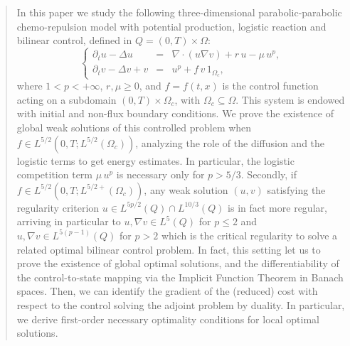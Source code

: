 \documentclass[11pt,reqno]{amsart}%
\numberwithin{equation}{section}
\begin{document}
\begin{abstract}
In this paper we study the following three-dimensional parabolic-parabolic chemo-repulsion model with potential production, logistic reaction and bilinear control, defined in $Q=(0,T)\times\Omega$:
\begin{equation*}\label{eq0}
\left\{
\begin{array}{rcl}
\partial_tu-\Delta u&=&\nabla\cdot(u\nabla v)+r\,u-\mu\, u^p,\\
\partial_tv-\Delta v+v&=&u^p+f\,v\, 1_{\Omega_c},
\end{array}
\right.
\end{equation*}
where $1< p<+\infty$, $r,\mu\geq 0$, and $f=f(t,x)$ is the control function acting  on a  subdomain $(0,T)\times \Omega_c $,  with $\Omega_c\subseteq\Omega$. 
This system is endowed with initial and non-flux boundary conditions. 
We prove the existence of global weak solutions of this controlled problem when $f\in L^{5/2}(0,T;L^{5/2}(\Omega_c))$, 
analyzing the role  of the diffusion and the logistic terms to get  energy estimates. In particular,  the logistic competition term $\mu \, u^p$ is  necessary only for $p>5/3$.
Secondly, if $f\in L^{5/2}(0,T;L^{5/2+}(\Omega_c))$, any weak solution $(u,v)$ satisfying the regularity criterion  $u\in L^{5p/2}(Q)\cap L^{10/3}(Q)$ is in fact more regular, arriving in particular to $u,\nabla v\in L^5(Q)$ for $p\le 2$ and $u,\nabla v\in L^{5(p-1)}(Q)$ for $p> 2$
which is the critical regularity to solve a related optimal bilinear control problem.
 In fact, this setting let us to prove the existence of global optimal solutions, and  the differentiability of the control-to-state mapping via the Implicit Function Theorem in Banach spaces. Then, we can identify the gradient of the (reduced) cost with respect to the control solving the adjoint problem
 by duality.  
 In particular, we derive  first-order necessary optimality conditions for local optimal solutions. 
\end{abstract}
\maketitle
\end{document}
